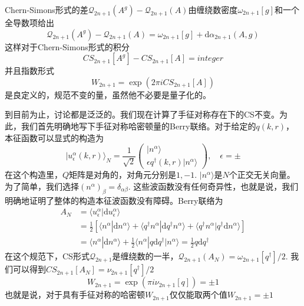 \documentclass[a4paper]{article}
\numberwithin{equation}{subsection}
\begin{document}
Chern-Simons形式的差$\mathcal{Q}_{2n+1}(A^g)-\mathcal{Q}_{2n+1}(A)$由缠绕数密度$\omega_{2n+1}[g]$和一个全导数项给出
\begin{equation}
    \mathcal{Q}_{2n+1}(A^g)-\mathcal{Q}_{2n+1}(A)=\omega_{2n+1}[g]+\mathrm{d}\alpha_{2n+1}(A,g)
\end{equation}
这样对于Chern-Simons形式的积分
\begin{equation}\label{CS integer}
    CS_{2n+1}[A^g]-CS_{2n+1}[A]=integer
\end{equation}
并且指数形式
\begin{equation}
    W_{2n+1}=\exp(2\pi i CS_{2n+1}[A])
\end{equation}
是良定义的，规范不变的量，虽然他不必要是量子化的。

到目前为止，讨论都是泛泛的。我们现在计算了手征对称存在下的CS不变。为此，我们首先明确地写下手征对称哈密顿量的Berry联络。对于给定的$q(k,r)$，本征函数可以显式的构造为
\begin{equation}
    |u^\alpha_\epsilon(k,r)\rangle_N=\frac{1}{\sqrt{2}}\begin{pmatrix}
        |n^\alpha\rangle\\
        \epsilon q^\dagger(k,r)|n^\alpha\rangle
    \end{pmatrix},\quad \epsilon=\pm
\end{equation}
在这个构造里，$Q$矩阵是对角的，对角元分别是$1,-1$. $|n^\alpha\rangle$是$N$个正交无关向量。为了简单，我们选择$(n^\alpha)_\beta=\delta_{\alpha\beta}$. 这些波函数没有任何奇异性，也就是说，我们明确地证明了整体的构造本征波函数没有障碍。Berry联络为
\begin{equation}
    \begin{split}
        A_N&=\langle u_\epsilon^\alpha|\mathrm{d}u_\epsilon^\alpha\rangle\\
        &=\frac{1}{2}\left[\langle n^\alpha|\mathrm{d}n^\alpha\rangle+\langle q^\dagger n^\alpha|\mathrm{d}q^\dagger n^\alpha\rangle+\langle q^\dagger n^\alpha|q^\dagger \mathrm{d}n^\alpha\rangle\right]\\
        &=\langle n^\alpha|\mathrm{d}n^\alpha\rangle+\frac{1}{2}\langle n^\alpha|q\mathrm{d}q^\dagger|n^\alpha\rangle=\frac{1}{2}q\mathrm{d}q^\dagger
    \end{split}
\end{equation}
在这个规范下，CS形式$\mathcal{Q}_{2n+1}$是缠绕数的一半，$\mathcal{Q}_{2n+1}(A_N)=\omega_{2n+1}[q^\dagger]/2$. 我们可以得到$CS_{2n+1}[A_N]=\nu_{2n+1}[q^\dagger]/2$
\begin{equation}
    W_{2n+1}=\exp(\pi i\nu_{2n+1}[q])=\pm 1
\end{equation}
也就是说，对于具有手征对称的哈密顿$W_{2n+1}$仅仅能取两个值$W_{2n+1}=\pm 1$
\end{document}
